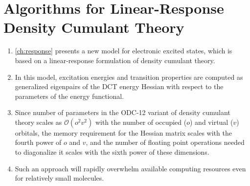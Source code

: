 \chapter[%
    Algorithms for Linear-Response Density Cumulant Theory
]{%
    Algorithms for Linear-Response Density Cumulant Theory
}
\label{ch:davidson}

\begin{enumerate}
    \item
        \cref{ch:response} presents a new model for electronic excited states,
        which is based on a linear-response formulation of density cumulant
        theory.
    \item
        In this model, excitation energies and transition properties are
        computed as generalized eigenpairs of the DCT energy Hessian with
        respect to the parameters of the energy functional.
    \item
        Since number of parameters in the ODC-12 variant of density cumulant
        theory scales as
        \(
            \mathcal{O}(o^2v^2)
        \)
        with the number of occupied (\(o\)) and virtual (\(v\)) orbitals, the
        memory requirement for the Hessian matrix scales with the fourth power
        of \(o\) and \(v\), and the number of floating point operations needed
        to diagonalize it scales with the sixth power of these dimensions.
    \item
        Such an approach will rapidly overwhelm available computing resources
        even for relatively small molecules.
\end{enumerate}



